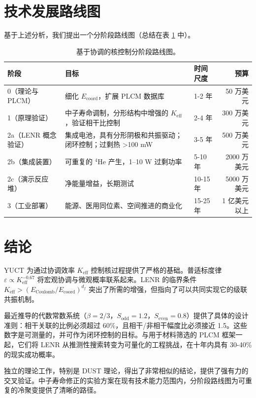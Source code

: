 \documentclass[12pt]{article}
\theoremstyle{remark}
\newcommand{\Keff}{K_{\mathrm{eff}}}
\newcommand{\df}{d_{\!f}}
\newcommand{\Sodd}{S_{\mathrm{odd}}}
\newcommand{\Seven}{S_{\mathrm{even}}}
\begin{document}
	\section{技术发展路线图}
	\label{sec:roadmap}
	
	基于上述分析，我们提出一个分阶段路线图（总结在表 \ref{tab:roadmap} 中）。
	
	\begin{table}[htbp]
		\centering
		\caption{基于协调的核控制分阶段路线图。}
		\label{tab:roadmap}
		\small
		\begin{tabular}{l p{5cm} l r}
			\toprule
			\textbf{阶段} & \textbf{目标} & \textbf{时间尺度} & \textbf{预算} \\
			\midrule
			0（理论与 PLCM） & 细化 \(E_{\mathrm{coord}}\)，扩展 PLCM 数据库 & 1-2 年 & 50 万美元 \\
			1（原理验证） & 中子寿命调制，分形结构中增强的 \(\Keff\)，验证相干比控制 & 2-4 年 & 300 万美元 \\
			2a（LENR 概念验证） & 集成电池，具有分形阴极和共振驱动；闭环控制；过剩热 >100 mW & 3-5 年 & 500 万美元 \\
			2b（集成装置） & 可重复的 \(^4\)He 产生，1–10 W 过剩功率 & 5-10 年 & 2000 万美元 \\
			2c（演示反应堆） & 净能量增益，长期测试 & 10-15 年 & 5000 万美元 \\
			3（工业部署） & 能源、医用同位素、空间推进的商业化 & 15-25 年 & 1 亿美元以上 \\
			\bottomrule
		\end{tabular}
	\end{table}
	
	\section{结论}
	\label{sec:conclusion}
	
	YUCT 为通过协调效率 \(\Keff\) 控制核过程提供了严格的基础。普适标度律 \(\varepsilon \propto \Keff^{-0.67}\) 将宏观协调与微观概率联系起来。LENR 的临界条件 \(\Keff > (E_{\text{Coulomb}}/E_{\text{coord}})^{\df}\) 突出了所需的增强，但指向了可以共同实现它的级联共振机制。
	
	最近推导的代数常数系统（\(\beta=2/3\)，\(\Sodd=1.2\)，\(\Seven=0.8\)）提供了具体的设计准则：相干关联的比例必须超过 60\%，且相干/非相干幅度比必须接近 1.5。这些数字是可测量的，并可作为闭环控制的目标。与用于材料筛选的 PLCM 框架一起，它们将 LENR 从推测性搜索转变为可量化的工程挑战，在十年内具有 30-40\% 的现实成功概率。
	
	独立的理论工作，特别是 DUST 理论，得出了非常相似的结论，提供了强有力的交叉验证。中子寿命修正的实验方案在现有技术能力范围内，分阶段路线图为可重复的冷聚变提供了清晰的路径。
	
\end{document}
